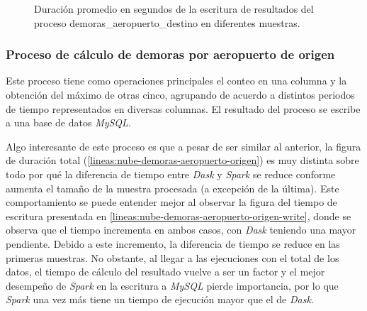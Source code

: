 \begin{figure}
\centering
{}
\caption{Duración promedio en segundos de la escritura de resultados del proceso demoras\_aeropuerto\_destino en diferentes muestras.}
\label{lineas:nube-demoras-aeropuerto-destino-write}
\end{figure}

\subsubsection{Proceso de cálculo de demoras por aeropuerto de origen}

Este proceso tiene como operaciones principales el conteo en una columna y la obtención del máximo de otras cinco, agrupando de acuerdo a distintos periodos de tiempo representados en diversas columnas. El resultado del proceso se escribe a una base de datos \textit{MySQL}.

Algo interesante de este proceso es que a pesar de ser similar al anterior, la figura de duración total (\ref{lineas:nube-demoras-aeropuerto-origen}) es muy distinta sobre todo por qué la diferencia de tiempo entre \textit{Dask} y \textit{Spark} se reduce conforme aumenta el tamaño de la muestra procesada (a excepción de la última). Este comportamiento se puede entender mejor al observar la figura del tiempo de escritura presentada en \ref{lineas:nube-demoras-aeropuerto-origen-write}, donde se observa que el tiempo incrementa en ambos casos, con \textit{Dask} teniendo una mayor pendiente. Debido a este incremento, la diferencia de tiempo se reduce en las primeras muestras. No obstante, al llegar a las ejecuciones con el total de los datos, el tiempo de cálculo del resultado vuelve a ser un factor y el mejor desempeño de \textit{Spark} en la escritura a \textit{MySQL} pierde importancia, por lo que \textit{Spark} una vez más tiene un tiempo de ejecución mayor que el de \textit{Dask}.



